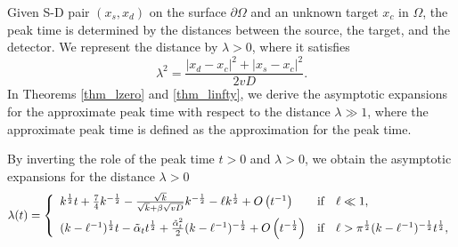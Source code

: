 \documentclass[10pt]{article}
\numberwithin{equation}{section}
\numberwithin{figure}{section}
\begin{document}
Given S-D pair $(x_s, x_d)$ on the surface $\partial \Omega$ and an unknown target $x_c$ in $\Omega$, the peak time is determined by the distances between the source, the target, and the detector. We represent the distance by $\lambda>0$, where it satisfies
\begin{equation}\label{def_distance}
\lambda^2 = \frac{|x_d-x_c|^2+|x_s-x_c|^2}{2vD}.
\end{equation}
In Theorems \ref{thm_lzero} and \ref{thm_linfty}, we derive the asymptotic expansions for the approximate peak time with respect to the distance $\lambda \gg 1$, where the approximate peak time is defined as the approximation for the peak time.
\begin{comment}
\begin{equation}\label{expanforpeaktime}
t = \left\{
\begin{array}{ll}
k^{-\frac{1}{2}}\lambda - \frac{7}{4}k^{-1} + \frac{\sqrt{k}}{\sqrt{k}+\beta\sqrt{vD}}k^{-1} + \ell + O\left(\lambda^{-1}\right) &  \mbox{if} \quad \ell \ll 1, \vspace{5pt} \\ 
(k-\ell^{-1})^{-\frac{1}{2}} \lambda + (k-\ell^{-1})^{-\frac{3}{4}} \alpha_\lambda \lambda^\frac{1}{2} 
+ O\left( \lambda^{-\frac{1}{2}} \right) & 
\mbox{if} \quad \ell>\pi^{\frac{1}{2}}(k-\ell^{-1})^{-\frac{3}{4}}\lambda^{\frac{1}{2}},
\end{array}
\right.
\end{equation}
where
$$
k := v \mu_a >0, \quad 
\alpha_\lambda := \left(-\log\left[ (\pi^{\frac{1}{2}} \ell^{-1} (k-\ell^{-1})^{-\frac{3}{4}}) \lambda^\frac{1}{2} \right] \right)^\frac{1}{2} < \infty.
$$
\end{comment}
By inverting the role of the peak time $t>0$ and $\lambda>0$, we obtain the asymptotic expansions for the distance $\lambda>0$ 
\begin{equation}\label{expanforlambda}
\lambda(t) = \left\{
\begin{array}{ll}
k^\frac{1}{2}t + \frac{7}{4}k^{-\frac{1}{2}} - 
\frac{\sqrt{k}}{\sqrt{k} + \beta \sqrt{vD}}k^{-\frac{1}{2}}
-\ell k^\frac{1}{2} + O\left(t^{-1}\right) &  \mbox{if} \quad \ell \ll 1, \vspace{5pt} \\ 
(k-\ell^{-1})^\frac{1}{2}t - \tilde \alpha_t t^\frac{1}{2} + \frac{\tilde \alpha_t^2}{2} (k-\ell^{-1})^{-\frac{1}{2}} + O\left(t^{-\frac{1}{2}}\right)& 
\mbox{if} \quad \ell > \pi^{\frac{1}{2}} (k-\ell^{-1})^{-\frac{1}{2}} t^\frac{1}{2},
\end{array}
\right.
\end{equation}
\end{document}
